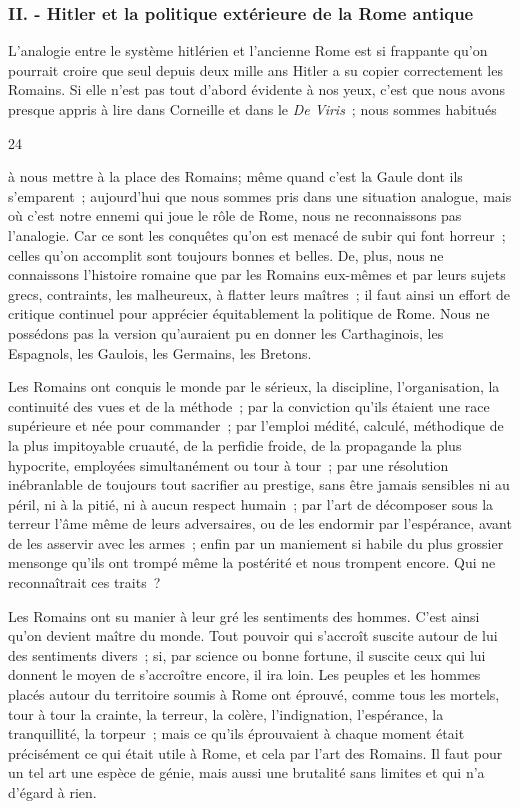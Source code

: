 \documentclass[french,twoside]{book} %
\begin{document}
\subsubsection[{II. - Hitler et la politique extérieure de la Rome antique}]{II. - Hitler et la politique extérieure de la Rome antique}
\noindent \par
L'analogie entre le système hitlérien et l'ancienne Rome est si frappante qu'on pourrait croire que seul depuis deux mille ans Hitler a su copier correctement les Romains. Si elle n'est pas tout d'abord évidente à nos yeux, c'est que nous avons presque appris à lire dans Corneille et dans le {\itshape De Viris} ; nous sommes habitués\par
24\par
à nous mettre à la place des Romains; même quand c'est la Gaule dont ils s'emparent ; aujourd'hui que nous sommes pris dans une situation analogue, mais où c'est notre ennemi qui joue le rôle de Rome, nous ne reconnaissons pas l'analogie. Car ce sont les conquêtes qu'on est menacé de subir qui font horreur ; celles qu'on accomplit sont toujours bonnes et belles. De, plus, nous ne connaissons l'histoire romaine que par les Romains eux-mêmes et par leurs sujets grecs, contraints, les malheureux, à flatter leurs maîtres ; il faut ainsi un effort de critique continuel pour apprécier équitablement la politique de Rome. Nous ne possédons pas la version qu'auraient pu en donner les Cartha­ginois, les Espagnols, les Gaulois, les Germains, les Bretons.\par
Les Romains ont conquis le monde par le sérieux, la discipline, l'organisa­tion, la continuité des vues et de la méthode ; par la conviction qu'ils étaient une race supérieure et née pour commander ; par l'emploi médité, calculé, méthodique de la plus impitoyable cruauté, de la perfidie froide, de la propagande la plus hypocrite, employées simultanément ou tour à tour ; par une résolution inébranlable de toujours tout sacrifier au prestige, sans être jamais sensibles ni au péril, ni à la pitié, ni à aucun respect humain ; par l'art de décomposer sous la terreur l'âme même de leurs adversaires, ou de les endormir par l'espérance, avant de les asservir avec les armes ; enfin par un maniement si habile du plus grossier mensonge qu'ils ont trompé même la postérité et nous trompent encore. Qui ne reconnaîtrait ces traits ?\par
Les Romains ont su manier à leur gré les sentiments des hommes. C'est ainsi qu'on devient maître du monde. Tout pouvoir qui s'accroît suscite autour de lui des sentiments divers ; si, par science ou bonne fortune, il suscite ceux qui lui donnent le moyen de s'accroître encore, il ira loin. Les peuples et les hommes placés autour du territoire soumis à Rome ont éprouvé, comme tous les mortels, tour à tour la crainte, la terreur, la colère, l'indignation, l'espé­rance, la tranquillité, la torpeur ; mais ce qu'ils éprouvaient à chaque moment était précisément ce qui était utile à Rome, et cela par l'art des Romains. Il faut pour un tel art une espèce de génie, mais aussi une brutalité sans limites et qui n'a d'égard à rien.\par
\end{document}
